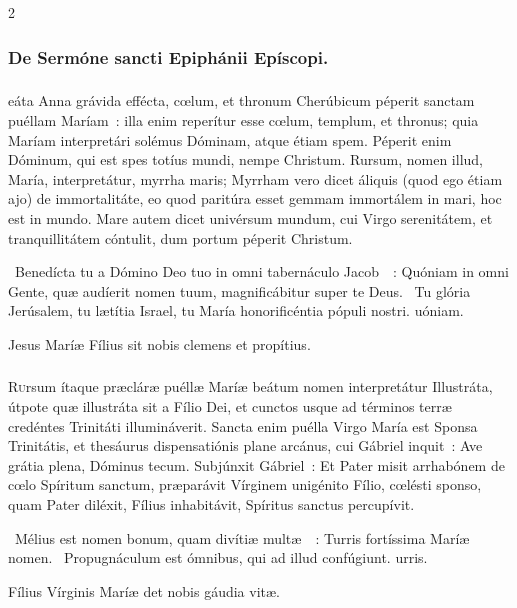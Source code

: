 \documentclass[9pt,twoside]{extarticle}
\begin{document}
\begin{multicols}{2}
{\subsubsection*{\center De Sermóne sancti Epiphánii Epíscopi.}
\subsubsection*{\center {}}
eáta Anna grávida effécta, cœlum, et thronum Cherúbicum péperit sanctam puéllam Maríam~: illa enim reperítur esse cœlum, templum, et thronus; quia Maríam interpretári solémus Dóminam, atque étiam spem. Péperit enim Dóminum, qui est spes totíus mundi, nempe Christum. Rursum, nomen illud, María, interpretátur, myrrha maris; Myrrham vero dicet áliquis (quod ego étiam ajo) de immortalitáte, eo quod paritúra esset gemmam immortálem in mari, hoc est in mundo. Mare autem dicet univérsum mundum, cui Virgo serenitátem, et tranquillitátem cóntulit, dum portum péperit Christum.

\begin{tightlist}{}
\item {}~Benedícta tu a Dómino Deo tuo in omni tabernáculo Jacob~~: \textred{*} Quóniam in omni Gente, quæ audíerit nomen tuum, magnificábitur super te Deus. ~Tu glória Jerúsalem, tu lætítia Israel, tu María honorificéntia pópuli nostri. uóniam.
\item {\small {} Jesus Maríæ Fílius sit nobis clemens et propítius.}
\end{tightlist}

\subsubsection*{\center {}}
\lettrine{R}ursum ítaque præcláræ puéllæ Maríæ beátum nomen interpretátur Illustráta, útpote quæ illustráta sit a Fílio Dei, et cunctos usque ad términos terræ credéntes Trinitáti illumináverit. Sancta enim puélla Virgo María est Sponsa Trinitátis, et thesáurus dispensatiónis plane arcánus, cui Gábriel inquit~: Ave grátia plena, Dóminus tecum. Subjúnxit Gábriel~: Et Pater misit arrhabónem de cœlo Spíritum sanctum, præparávit Vírginem unigénito Fílio, cœlésti sponso, quam Pater diléxit, Fílius inhabitávit, Spíritus sanctus percupívit.

\begin{tightlist}{}
\item {}~Mélius est nomen bonum, quam divítiæ multæ~~: \textred{*} Turris fortíssima Maríæ nomen. ~Propugnáculum est ómnibus, qui ad illud confúgiunt. urris.
\item {\small {} Fílius Vírginis Maríæ det nobis gáudia vitæ.}
\end{tightlist}

}
\end{multicols}
\end{document}
